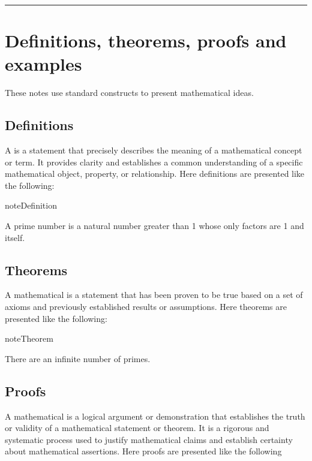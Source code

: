 \documentclass[letterpaper,10pt,english]{jupyterBook}
\begin{document}
\bigskip\hrule\bigskip



\section{Definitions, theorems, proofs and examples}
\label{\detokenize{_pages/0.3_Mathematical_preliminaries:definitions-theorems-proofs-and-examples}}
\sphinxAtStartPar
These notes use standard constructs to present mathematical ideas.


\subsection{Definitions}
\label{\detokenize{_pages/0.3_Mathematical_preliminaries:definitions}}
\sphinxAtStartPar
A  is a statement that precisely describes the meaning of a mathematical concept or term. It provides clarity and establishes a common understanding of a specific mathematical object, property, or relationship. Here definitions are presented like the following:
\label{_pages/0.3_Mathematical_preliminaries:definition-0}
\begin{sphinxadmonition}{note}{Definition}



\sphinxAtStartPar
A prime number is a natural number greater than 1 whose only factors are 1 and itself.
\end{sphinxadmonition}


\subsection{Theorems}
\label{\detokenize{_pages/0.3_Mathematical_preliminaries:theorems}}
\sphinxAtStartPar
A mathematical  is a statement that has been proven to be true based on a set of axioms and previously established results or assumptions. Here theorems are presented like the following:
\label{_pages/0.3_Mathematical_preliminaries:theorem-1}
\begin{sphinxadmonition}{note}{Theorem}



\sphinxAtStartPar
There are an infinite number of primes.
\end{sphinxadmonition}


\subsection{Proofs}
\label{\detokenize{_pages/0.3_Mathematical_preliminaries:proofs}}
\sphinxAtStartPar
A mathematical  is a logical argument or demonstration that establishes the truth or validity of a mathematical statement or theorem. It is a rigorous and systematic process used to justify mathematical claims and establish certainty about mathematical assertions. Here proofs are presented like the following
\end{document}
